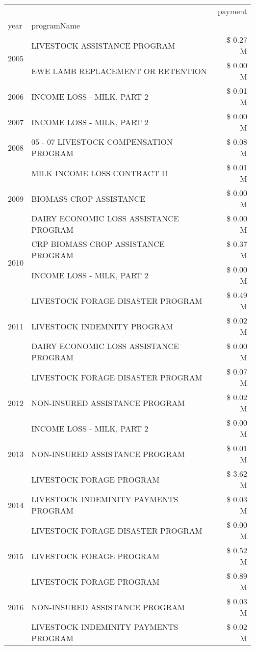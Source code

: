 \begin{tabular}{llr}
\toprule
 &  & payment \\
year & programName &  \\
\midrule
\multirow[t]{2}{*}{2005} & LIVESTOCK ASSISTANCE PROGRAM & \$ 0.27 M \\
 & EWE LAMB REPLACEMENT OR RETENTION & \$ 0.00 M \\
\cline{1-3}
2006 & INCOME LOSS - MILK, PART 2 & \$ 0.01 M \\
\cline{1-3}
2007 & INCOME LOSS - MILK, PART 2 & \$ 0.00 M \\
\cline{1-3}
2008 & 05 - 07 LIVESTOCK COMPENSATION PROGRAM & \$ 0.08 M \\
\cline{1-3}
\multirow[t]{3}{*}{2009} & MILK INCOME LOSS CONTRACT II & \$ 0.01 M \\
 & BIOMASS CROP ASSISTANCE & \$ 0.00 M \\
 & DAIRY ECONOMIC LOSS ASSISTANCE PROGRAM & \$ 0.00 M \\
\cline{1-3}
\multirow[t]{2}{*}{2010} & CRP BIOMASS CROP ASSISTANCE PROGRAM & \$ 0.37 M \\
 & INCOME LOSS - MILK, PART 2 & \$ 0.00 M \\
\cline{1-3}
\multirow[t]{3}{*}{2011} & LIVESTOCK FORAGE DISASTER PROGRAM & \$ 0.49 M \\
 & LIVESTOCK INDEMNITY PROGRAM & \$ 0.02 M \\
 & DAIRY ECONOMIC LOSS ASSISTANCE PROGRAM & \$ 0.00 M \\
\cline{1-3}
\multirow[t]{3}{*}{2012} & LIVESTOCK FORAGE DISASTER PROGRAM & \$ 0.07 M \\
 & NON-INSURED ASSISTANCE PROGRAM & \$ 0.02 M \\
 & INCOME LOSS - MILK, PART 2 & \$ 0.00 M \\
\cline{1-3}
2013 & NON-INSURED ASSISTANCE PROGRAM & \$ 0.01 M \\
\cline{1-3}
\multirow[t]{3}{*}{2014} & LIVESTOCK FORAGE PROGRAM & \$ 3.62 M \\
 & LIVESTOCK INDEMINITY PAYMENTS PROGRAM & \$ 0.03 M \\
 & LIVESTOCK FORAGE DISASTER PROGRAM & \$ 0.00 M \\
\cline{1-3}
2015 & LIVESTOCK FORAGE PROGRAM & \$ 0.52 M \\
\cline{1-3}
\multirow[t]{3}{*}{2016} & LIVESTOCK FORAGE PROGRAM & \$ 0.89 M \\
 & NON-INSURED ASSISTANCE PROGRAM & \$ 0.03 M \\
 & LIVESTOCK INDEMINITY PAYMENTS PROGRAM & \$ 0.02 M \\

\end{tabular}

